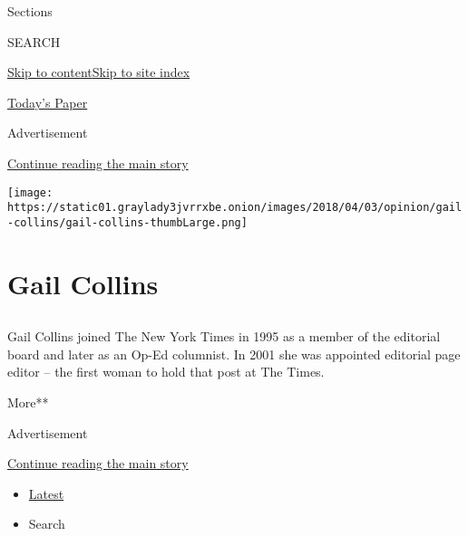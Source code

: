 Sections

SEARCH

\protect\hyperlink{site-content}{Skip to
content}\protect\hyperlink{site-index}{Skip to site index}

\href{https://myaccount.nytimes3xbfgragh.onion/auth/login?response_type=cookie\&client_id=vi}{}

\href{https://www.nytimes3xbfgragh.onion/section/todayspaper}{Today's
Paper}

Advertisement

\protect\hyperlink{after-top}{Continue reading the main story}

\texttt{[image: https://static01.graylady3jvrrxbe.onion/images/2018/04/03/opinion/gail-collins/gail-collins-thumbLarge.png]}

\hypertarget{gail-collins}{%
\section{Gail Collins}\label{gail-collins}}

\hypertarget{section}{%
\subsection{}\label{section}}

Gail Collins joined The New York Times in 1995 as a member of the
editorial board and later as an Op-Ed columnist. In 2001 she was
appointed editorial page editor -- the first woman to hold that post at
The Times.

More**

Advertisement

\protect\hyperlink{after-mid1}{Continue reading the main story}

\begin{itemize}
\tightlist
\item
  \protect\hyperlink{stream-panel}{Latest}
\item
  Search
\end{itemize}

